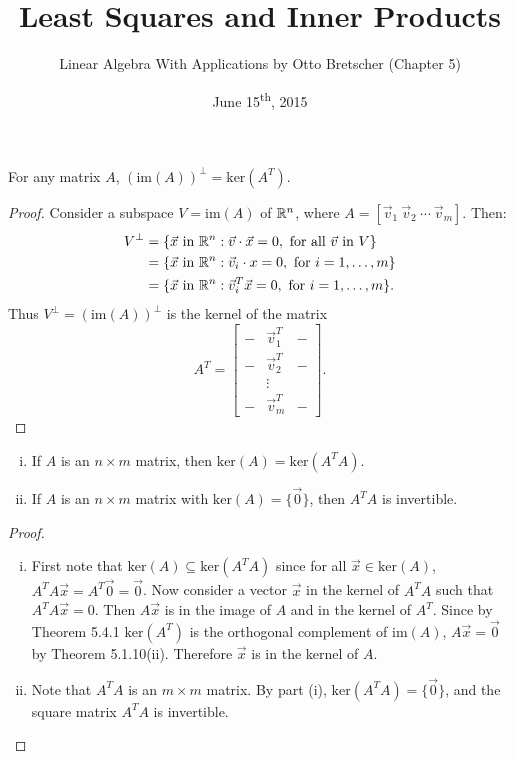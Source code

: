\documentclass[a4paper,8pt]{article}
\title{Least Squares and Inner Products}
\author{Linear Algebra With Applications by Otto Bretscher (Chapter 5)}
\date{June 15\textsuperscript{th}, 2015}
\begin{document}
\maketitle
{}

\begin{outline}

    For any matrix \(A\), \((\text{im}(A))^{\perp} = \text{ker}(A^T)\).

    \begin{proof}
      Consider a subspace \(V = \text{im}(A)\) of \(\mathbb{R}^n\), where \(A = \left[\vec{v}_1\:\vec{v}_2\:\cdots\:\vec{v}_m\right]\). Then:
      \begin{align*}
        V^{\perp} &= \{ \vec{x}\text{ in }\mathbb{R}^n: \vec{v}\cdot\vec{x} = 0,\text{ for all } \vec{v} \text{ in } V \} \\
                  &= \{ \vec{x}\text{ in }\mathbb{R}^n: \vec{v}_i\cdot x = 0,\text{ for } i = 1,\ldots,m \} \\
                  &= \{ \vec{x}\text{ in }\mathbb{R}^n: \vec{v}_i^T\vec{x} = 0, \text{ for } i = 1, \ldots, m \}\text{.}
      \end{align*}
      Thus \(V^{\perp} = (\text{im}(A))^{\perp}\) is the kernel of the matrix
      \[ A^T = \begin{bmatrix}- & \vec{v}_1^T & - \\ - & \vec{v}_2^T & - \\ & \vdots & \\ - & \vec{v}_m^T & - \end{bmatrix}\text{.} \]
    \end{proof}

    \begin{enumerate}[i.]
      \item If \(A\) is an \(n \times m\) matrix, then \(\text{ker}(A) = \text{ker}(A^TA)\).
      \item If \(A\) is an \(n \times m\) matrix with \(\text{ker}(A) = \{\vec{0}\}\), then \(A^TA\) is invertible.
    \end{enumerate}

    \begin{proof}
      \begin{enumerate}[i.]
        \item
          First note that \(\text{ker}(A) \subseteq \text{ker}(A^TA)\) since for all \(\vec{x}\in\text{ker}(A)\), \(A^TA\vec{x} = A^T\vec{0} = \vec{0}\).
          Now consider a vector \(\vec{x}\) in the kernel of \(A^TA\) such that \(A^TA\vec{x}=0\). Then \(A\vec{x}\) is in the image of \(A\) and in
          the kernel of \(A^T\). Since by Theorem 5.4.1 \(\text{ker}(A^T)\) is the orthogonal complement of \(\text{im}(A)\), \(A\vec{x} = \vec{0}\) by
          Theorem 5.1.10(ii). Therefore \(\vec{x}\) is in the kernel of \(A\).
        \item
          Note that \(A^TA\) is an \(m \times m\) matrix. By part (i), \(\text{ker}(A^TA) = \{\vec{0}\}\), and the square matrix \(A^TA\) is invertible.
      \end{enumerate}
    \end{proof}


\end{outline}
\end{document}
